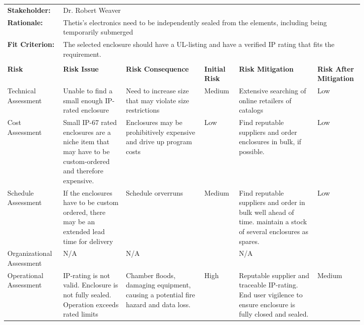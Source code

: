 \begin{landscape}
{\begin{longtable}{| p{0.12\linewidth} | p{0.16\linewidth} |  p{0.20\linewidth} | p{0.08\linewidth} | p{0.20\linewidth} | p{0.08\linewidth} |}
	\hline
	\rowcolor[gray]{0.8}
	\multicolumn{6}{|c|}{ } \\
	\hline
	\textbf{Stakeholder:} & \multicolumn{5}{|l|}{Dr. Robert Weaver} \\
	\hline
	\textbf{Rationale:} & \multicolumn{5}{|p{0.8\linewidth}|}{Thetis's electronics need to be independently sealed from the elements, including being temporarily submerged } \\
	\hline
	\textbf{Fit Criterion:} & \multicolumn{5}{|p{0.8\linewidth}|}{The selected enclosure should have a UL-listing and have a verified IP rating that fits the requirement.} \\
	\hline
	\rowcolor[gray]{0.8}
	\multicolumn{6}{|c|}{ } \\
	\hline
	\textbf{Risk} & \textbf{Risk Issue} & \textbf{Risk Consequence} & \textbf{Initial Risk} & \textbf{Risk Mitigation} & \textbf{Risk \newline After \newline Mitigation} \\
	\hline
	Technical \newline Assessment & Unable to find a small enough IP-rated enclosure & Need to increase size that may violate size restrictions & \cellcolor{yellow} Medium & Extensive searching of online retailers of catalogs & \cellcolor{green} Low \\
	\hline
	Cost \newline Assessment & Small IP-67 rated enclosures are a niche item that may have to be custom-ordered and therefore expensive. & Enclosures may be prohibitively expensive and drive up program costs & \cellcolor{green} Low & Find reputable suppliers and order enclosures in bulk, if possible. & \cellcolor{green} Low \\
	\hline
	Schedule \newline Assessment & If the enclosures have to be custom ordered, there may be an extended lead time for delivery & Schedule orverruns & \cellcolor{yellow} Medium & Find reputable suppliers and order in bulk well ahead of time. \newline maintain a stock of several enclosures as spares. & \cellcolor{green} Low \\
	\hline
	Organizational \newline Assessment & N/A & N/A & \cellcolor[gray]{0.8} & N/A & \cellcolor[gray]{0.8} \\
	\hline
	Operational \newline Assessment & IP-rating is not valid. \newline Enclosure is not fully sealed. \newline Operation exceeds rated limits & Chamber floods, damaging equipment, causing a potential fire hazard and data loss. & \cellcolor{red} High & Reputable supplier and traceable IP-rating. \newline End user vigilence to ensure enclosure is fully closed and sealed. & \cellcolor{yellow} Medium
	\label{tab:sr02_feasibility}
\end{longtable}
}
\newpage


\end{landscape}
